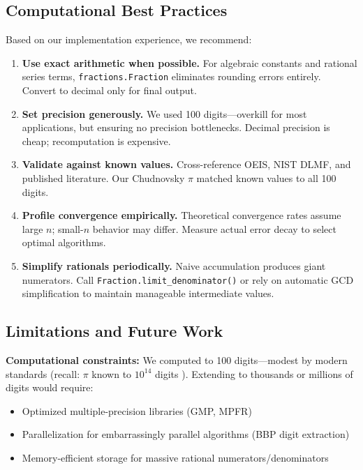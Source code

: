 \documentclass[11pt,a4paper]{article}
\begin{document}
\subsection{Computational Best Practices}

Based on our implementation experience, we recommend:

\begin{enumerate}
    \item \textbf{Use exact arithmetic when possible.} For algebraic constants and rational series terms, \texttt{fractions.Fraction} eliminates rounding errors entirely. Convert to decimal only for final output.
    \item \textbf{Set precision generously.} We used 100 digits—overkill for most applications, but ensuring no precision bottlenecks. Decimal precision is cheap; recomputation is expensive.
    \item \textbf{Validate against known values.} Cross-reference OEIS, NIST DLMF, and published literature. Our Chudnovsky $\pi$ matched known values to all 100 digits.
    \item \textbf{Profile convergence empirically.} Theoretical convergence rates assume large $n$; small-$n$ behavior may differ. Measure actual error decay to select optimal algorithms.
    \item \textbf{Simplify rationals periodically.} Naive accumulation produces giant numerators. Call \texttt{Fraction.limit\_denominator()} or rely on automatic GCD simplification to maintain manageable intermediate values.
\end{enumerate}

\subsection{Limitations and Future Work}

\textbf{Computational constraints:} We computed to 100 digits—modest by modern standards (recall: $\pi$ known to $10^{14}$ digits \citep{pirecord2025}). Extending to thousands or millions of digits would require:
\begin{itemize}
    \item Optimized multiple-precision libraries (GMP, MPFR)
    \item Parallelization for embarrassingly parallel algorithms (BBP digit extraction)
    \item Memory-efficient storage for massive rational numerators/denominators
\end{itemize}
\end{document}
